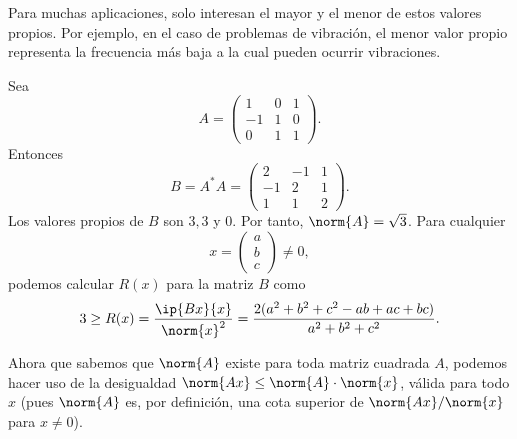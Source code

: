 Para muchas aplicaciones, solo interesan el mayor y el menor de estos valores propios. Por ejemplo, en el caso de problemas de vibración, el menor valor propio representa la frecuencia más baja a la cual pueden ocurrir vibraciones.

\begin{ejemplo}
    Sea
    \begin{equation*}
        A=\begin{pmatrix}1&0&1\\-1&1&0\\0&1&1\end{pmatrix}.
    \end{equation*}
    Entonces
    \begin{equation*}
        B=A^*A=\begin{pmatrix}2&-1&1\\-1&2&1\\1&1&2\end{pmatrix}.
    \end{equation*}
    Los valores propios de $B$ son $3,3$ y $0$. Por tanto, $\norm{A}=\sqrt3$. Para cualquier
    \begin{equation*}
        x=\begin{pmatrix}a\\b\\c\end{pmatrix}\neq 0,
    \end{equation*}
    podemos calcular $R(x)$ para la matriz $B$ como
    \begin{equation*}
        3\geq R(x)=\frac{\ip{Bx}{x}}{\norm{x}^2}=\frac{2(a^2+b^2+c^2-ab+ac+bc)}{a^2+b^2+c^2}.
    \end{equation*}
\end{ejemplo}

Ahora que sabemos que $\norm{A}$ existe para toda matriz cuadrada $A$, podemos hacer uso de la desigualdad $\norm{Ax}\leq\norm{A}\cdot\norm{x}$, válida para todo $x$ (pues $\norm{A}$ es, por definición, una cota superior de $\norm{Ax}/\norm{x}$ para $x\neq0$).

